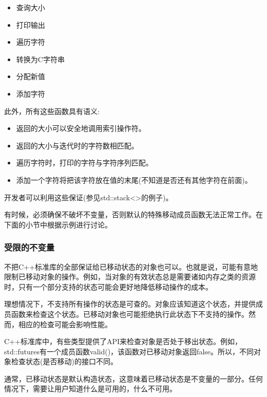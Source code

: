 \begin{itemize}
	\item 查询大小
	\item 打印输出
	\item 遍历字符
	\item 转换为C字符串
	\item 分配新值
	\item 添加字符
\end{itemize}

此外，所有这些函数具有语义:

\begin{itemize}
	\item 返回的大小可以安全地调用索引操作符。
	\item 返回的大小与迭代时的字符数相匹配。
	\item 遍历字符时，打印的字符与字符序列匹配。
	\item 添加一个字符将把该字符放在值的末尾(不知道是否还有其他字符在前面)。
\end{itemize}

开发者可以利用这些保证(参见std::stack<>的例子)。

有时候，必须确保不破坏不变量，否则默认的特殊移动成员函数无法正常工作。在下面的小节中根据示例进行讨论。

\subsubsection{受限的不变量}

不把C++标准库的全部保证给已移动状态的对象也可以。也就是说，可能有意地限制已移动对象的操作。例如，当对象的有效状态总是需要诸如内存之类的资源时，只有一个部分支持的状态可能会更好地降低移动操作的成本。

理想情况下，不支持所有操作的状态是可查的。对象应该知道这个状态，并提供成员函数来检查这个状态。已移动对象也可能拒绝执行此状态下不支持的操作。然而，相应的检查可能会影响性能。

C++标准库中，有些类型提供了API来检查对象是否处于移出状态。例如，std::futures有一个成员函数valid()，该函数对已移动对象返回false。所以，不同对象检查状态(是否移动)的接口不同。

通常，已移动状态是默认构造状态，这意味着已移动状态是不变量的一部分。任何情况下，需要让用户知道什么是可用的，什么不可用。




